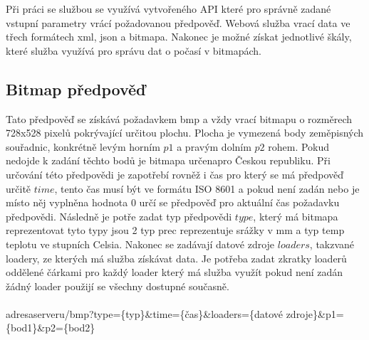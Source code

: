\documentclass[czech,bachelor,dept460,male,csharp,cpdeclaration]{diploma}
\begin{document}
	Při práci se službou se využívá vytvořeného API které pro správně zadané vstupní parametry vrácí požadovanou předpověď. Webová služba vrací data ve třech formátech xml, json a bitmapa. Nakonec je možné získat jednotlivé škály, které služba využívá pro správu dat o počasí v bitmapách.
	
	\subsection{Bitmap předpověď}
	
	Tato předpověď se získává požadavkem bmp a vždy vrací bitmapu o rozměrech 728x528 pixelů pokrývající určitou plochu. Plocha je vymezená body zeměpisných souřadnic, konkrétně levým horním $p1$ a pravým dolním $p2$ rohem. Pokud nedojde k zadání těchto bodů je bitmapa určenapro Českou republiku. Při určování této předpovědi je zapotřebí rovněž i čas pro který se má předpověď určitě $time$, tento čas musí být ve formátu ISO 8601 a pokud není zadán nebo je místo něj vyplněna hodnota 0 určí se předpověď pro aktuální čas požadavku předpovědi. Následně je potře zadat typ předpovědi $type$, který má bitmapa reprezentovat tyto typy jsou 2 typ prec reprezentuje srážky v mm a typ temp teplotu ve stupních Celsia. Nakonec se zadávají datové zdroje $loaders$, takzvané loadery, ze kterých má služba získávat data. Je potřeba zadat zkratky loaderů oddělené čárkami pro každý loader který má služba využít pokud není zadán žádný loader použijí se všechny dostupné současně.
	\\\\
	adresaserveru/bmp?type=\{typ\}\&time=\{čas\}\&loaders=\{datové zdroje\}\&p1=\{bod1\}\&p2=\{bod2\}
	
\end{document}

